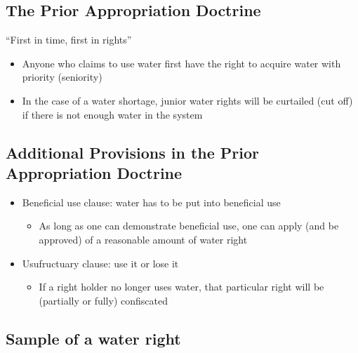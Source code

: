 \documentclass[]{article}
\providecommand{\tightlist}{%
  \setlength{\itemsep}{0pt}\setlength{\parskip}{0pt}}
\begin{document}
\hypertarget{the-prior-appropriation-doctrine}{%
\subsection{The Prior Appropriation
Doctrine}\label{the-prior-appropriation-doctrine}}

``First in time, first in rights''

\begin{itemize}
\tightlist
\item
  Anyone who claims to use water first have the right to acquire water
  with priority (seniority)
\item
  In the case of a water shortage, junior water rights will be curtailed
  (cut off) if there is not enough water in the system
\end{itemize}

\hypertarget{additional-provisions-in-the-prior-appropriation-doctrine}{%
\subsection{Additional Provisions in the Prior Appropriation
Doctrine}\label{additional-provisions-in-the-prior-appropriation-doctrine}}

\begin{itemize}
\tightlist
\item
  Beneficial use clause: water has to be put into beneficial use

  \begin{itemize}
  \tightlist
  \item
    As long as one can demonstrate beneficial use, one can apply (and be
    approved) of a reasonable amount of water right
  \end{itemize}
\item
  Usufructuary clause: use it or lose it

  \begin{itemize}
  \tightlist
  \item
    If a right holder no longer uses water, that particular right will
    be (partially or fully) confiscated
  \end{itemize}
\end{itemize}

\hypertarget{sample-of-a-water-right}{%
\subsection{Sample of a water right}\label{sample-of-a-water-right}}
\end{document}

